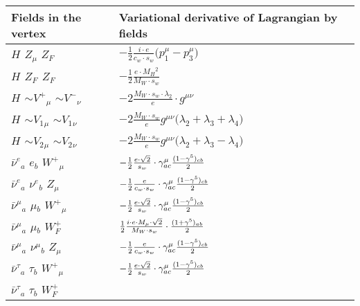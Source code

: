 \begin{center}
\begin{tabular}{|l|l|} \hline
Fields in the vertex & Variational derivative of Lagrangian by fields \\ \hline
${H}_{}$ \phantom{-} ${Z}_{\mu }$ \phantom{-} $Z_F{}_{}$ \phantom{-}  &
	$-\frac{1}{2}\frac{ i \cdot e}{ c_w \cdot s_w}\big(p_1^\mu -p_3^\mu \big)$\\[2mm]
${H}_{}$ \phantom{-} $Z_F{}_{}$ \phantom{-} $Z_F{}_{}$ \phantom{-}  &
	$-\frac{1}{2}\frac{ e \cdot M_H{}^2 }{ M_W \cdot s_w}$\\[2mm]
${H}_{}$ \phantom{-} $\sim V^+{}_{\mu }$ \phantom{-} $\sim V^-{}_{\nu }$ \phantom{-}  &
	$-2\frac{ M_W \cdot s_w \cdot \lambda_2}{ e}\cdot g^{\mu \nu} $\\[2mm]
${H}_{}$ \phantom{-} $\sim V_1{}_{\mu }$ \phantom{-} $\sim V_1{}_{\nu }$ \phantom{-}  &
	$-2\frac{ M_W \cdot s_w}{ e}g^{\mu \nu} \big( \lambda_2+ \lambda_3+ \lambda_4\big)$\\[2mm]
${H}_{}$ \phantom{-} $\sim V_2{}_{\mu }$ \phantom{-} $\sim V_2{}_{\nu }$ \phantom{-}  &
	$-2\frac{ M_W \cdot s_w}{ e}g^{\mu \nu} \big( \lambda_2+ \lambda_3- \lambda_4\big)$\\[2mm]
$\bar{\nu}^e{}_{a }$ \phantom{-} $e{}_{b }$ \phantom{-} $W^+{}_{\mu }$ \phantom{-}  &
	$-\frac{1}{2}\frac{ e \cdot\sqrt{2}}{ s_w}\cdot \gamma_{a c}^\mu {(1-\gamma^5)_{c b}\over 2} $\\[2mm]
$\bar{\nu}^e{}_{a }$ \phantom{-} $\nu^e{}_{b }$ \phantom{-} ${Z}_{\mu }$ \phantom{-}  &
	$-\frac{1}{2}\frac{ e}{ c_w \cdot s_w}\cdot \gamma_{a c}^\mu {(1-\gamma^5)_{c b}\over 2} $\\[2mm]
$\bar{\nu}^\mu{}_{a }$ \phantom{-} $\mu{}_{b }$ \phantom{-} $W^+{}_{\mu }$ \phantom{-}  &
	$-\frac{1}{2}\frac{ e \cdot\sqrt{2}}{ s_w}\cdot \gamma_{a c}^\mu {(1-\gamma^5)_{c b}\over 2} $\\[2mm]
$\bar{\nu}^\mu{}_{a }$ \phantom{-} $\mu{}_{b }$ \phantom{-} $W^+_F{}_{}$ \phantom{-}  &
	$\frac{1}{2}\frac{ i \cdot e \cdot M_{\mu} \cdot\sqrt{2}}{ M_W \cdot s_w}\cdot {(1+\gamma^5)_{a b}\over 2} $\\[2mm]
$\bar{\nu}^\mu{}_{a }$ \phantom{-} $\nu^\mu{}_{b }$ \phantom{-} ${Z}_{\mu }$ \phantom{-}  &
	$-\frac{1}{2}\frac{ e}{ c_w \cdot s_w}\cdot \gamma_{a c}^\mu {(1-\gamma^5)_{c b}\over 2} $\\[2mm]
$\bar{\nu}^\tau{}_{a }$ \phantom{-} $\tau{}_{b }$ \phantom{-} $W^+{}_{\mu }$ \phantom{-}  &
	$-\frac{1}{2}\frac{ e \cdot\sqrt{2}}{ s_w}\cdot \gamma_{a c}^\mu {(1-\gamma^5)_{c b}\over 2} $\\[2mm]
$\bar{\nu}^\tau{}_{a }$ \phantom{-} $\tau{}_{b }$ \phantom{-} $W^+_F{}_{}$ \phantom{-}  &

\end{tabular}
\end{center}
